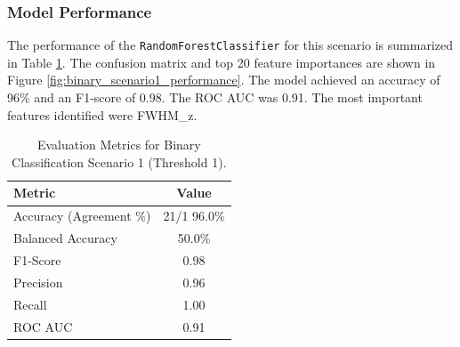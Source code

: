 
\subsubsection{Model Performance}
The performance of the \texttt{RandomForestClassifier} for this scenario is summarized in Table \ref{tab:binary_scenario1_metrics}. The confusion matrix and top 20 feature importances are shown in Figure \ref{fig:binary_scenario1_performance}. The model achieved an accuracy of 96\% and an F1-score of 0.98. The ROC AUC was 0.91. The most important features identified were FWHM\_z.
\begin{table}[H]
    \centering
    \caption{Evaluation Metrics for Binary Classification Scenario 1 (Threshold 1).}
    \label{tab:binary_scenario1_metrics}
    \begin{tabular}{lc}
        \toprule
        Metric & Value \\
        \midrule
        Accuracy (Agreement \%) & 21/1 96.0\% \\
        Balanced Accuracy & 50.0\% \\
        F1-Score & 0.98 \\
        Precision & 0.96 \\
        Recall & 1.00 \\
        ROC AUC & 0.91 \\
        \bottomrule
    \end{tabular}
\end{table}

